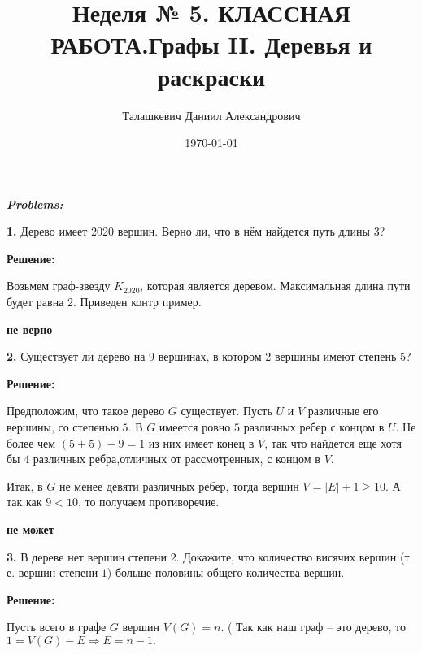 \documentclass[a4paper,12pt]{article} %
\author{Талашкевич Даниил Александрович}
\title{Неделя № 5. КЛАССНАЯ РАБОТА.Графы II. Деревья и раскраски}
\date{\today}
\begin{document}
\maketitle
\thispagestyle{empty}

\newpage
\setcounter{page}{1}
\begin{center}
\itshape
\bfseries
{ \Large Problems:}
\end{center}

{\bf 1.} Дерево имеет 2020 вершин. Верно ли, что в нём найдется путь длины 3? 
\begin{center}
\bfseries
{\Large Решение: }
\end{center}

Возьмем граф-звезду $K_{2020}$, которая является деревом. Максимальная длина пути будет равна 2. Приведен контр пример.

\begin{flushright}
\begin{large}
\textbf {не верно}
\end{large}
\end{flushright}

{\bf 2.} Существует ли дерево на 9 вершинах, в котором 2 вершины имеют степень 5? 
\begin{center}
\bfseries
{\Large Решение: }
\end{center}

Предположим, что такое дерево $G$ существует. Пусть $U$ и $V$ различные его вершины, со степенью $5$. В $G$ имеется ровно $5$ различных ребер с концом в $U$. Не более чем $(5+5) - 9 = 1$ из них имеет конец в $V$, так что найдется еще хотя бы $4$ различных ребра,отличных от рассмотренных, с концом в $V$.

Итак, в $G$ не менее девяти различных ребер, тогда вершин $V = |E| + 1 \geqslant 10$. А так как $9 < 10$, то получаем противоречие.

\begin{flushright}
\begin{large}
\textbf {не может}
\end{large}
\end{flushright}

{\bf 3. }В дереве нет вершин степени $2$. Докажите, что количество висячих вершин (т. е. вершин степени $1$) больше половины общего количества вершин. 
\begin{center}
\bfseries
{\Large Решение: }
\end{center}

Пусть всего в графе $G$ вершин $V(G) = n$. ( Так как наш граф -- это дерево, то  $1 = V(G) - E \Rightarrow E = n -1.$
\end{document}
